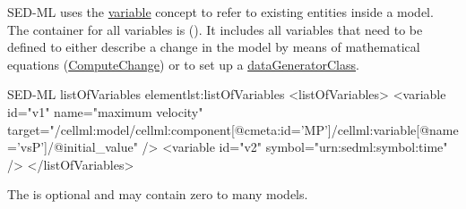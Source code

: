 \label{sec:listOfVariables}

SED-ML uses the \hyperref[class:variable]{variable} concept to refer to existing entities inside a model. The container for all variables is   (). It includes all variables that need to be defined to either describe a change in the model by means of mathematical equations (\hyperref[class:computeChange]{ComputeChange}) or to set up a \hyperref[class:dataGenerator]{dataGeneratorClass}.

%

%
\begin{myXmlLst}{SED-ML listOfVariables element}{lst:listOfVariables}
<listOfVariables>
 <variable id="v1" name="maximum velocity" target="/cellml:model/cellml:component[@cmeta:id='MP']/cellml:variable[@name='vsP']/@initial_value" />
 <variable id="v2" symbol="urn:sedml:symbol:time" />
</listOfVariables>
\end{myXmlLst}
%
 The  is optional and may contain zero to many models. 
